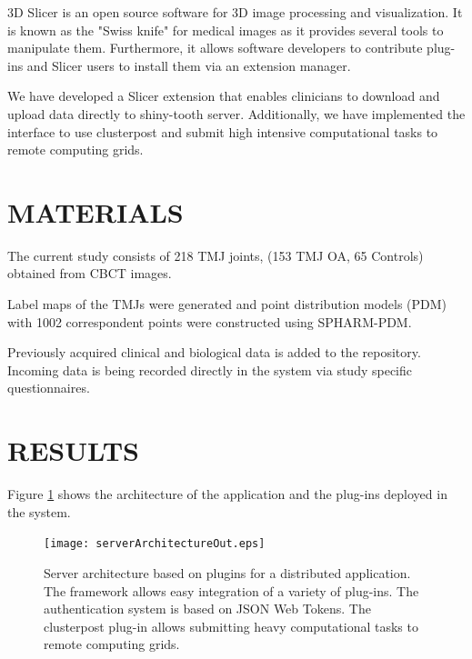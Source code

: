 \documentclass[]{spie}  %
\begin{document}
3D Slicer is an open source software for 3D image processing and visualization. 
It is known as the "Swiss knife" for medical images as it provides 
several tools to manipulate them.
Furthermore, it allows software developers to contribute plug-ins and 
Slicer users to install them via an extension manager. 

We have developed a Slicer extension
that enables clinicians to download and upload 
data directly to shiny-tooth server. Additionally, 
we have implemented the interface to use clusterpost and 
submit high intensive computational tasks to remote computing grids. 

\section{MATERIALS}

The current study consists of 218 TMJ joints, (153 TMJ OA, 65 Controls) obtained from CBCT 
images. 

Label maps of the TMJs were generated and point distribution models (PDM) with 1002 correspondent 
points were constructed using SPHARM-PDM\cite{Styner2006}. 

Previously acquired clinical and biological data 
is added to the repository. 
Incoming data is being recorded directly in the system via study specific questionnaires.

\section{RESULTS} 

Figure \ref{fig:serverArchitectureOut} shows the architecture of the application and 
the plug-ins deployed in the system.

\begin{figure}
	\centering 
	\texttt{[image: serverArchitectureOut.eps]}
	\caption[Server architecture]{Server architecture based on plugins for a distributed application. 
	The framework allows easy integration of a variety of plug-ins. The authentication system is based on JSON Web Tokens. 
	The clusterpost plug-in allows submitting heavy computational tasks to remote computing grids.}
	\label{fig:serverArchitectureOut}
\end{figure} 
\end{document}
